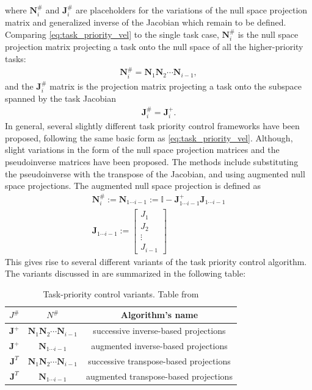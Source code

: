 where \(\bm{N}_i^{\#}\) and \(\bm{J}_i^{\#}\) are placeholders for the
variations of the null space projection matrix and generalized inverse of the Jacobian
which remain to be defined.
Comparing \autoref{eq:task_priority_vel} to the single task case, $\bm{N}_i^{\#}$ is the null space projection matrix
projecting a task onto the null space of all the higher-priority tasks:
\begin{align}
    \bm{N}_i^{\#} = \bm{N}_1 \bm{N}_2 \cdots \bm{N}_{i-1},
\end{align}
and the $\bm{J}_i^{\#}$ matrix is the projection matrix projecting a task onto the
subspace spanned by the task Jacobian
\begin{align}
    \bm{J}_i^{\#} = \bm{J}_i^+.
\end{align}
In general, several slightly different task priority control frameworks have
been proposed, following the same basic form as \autoref{eq:task_priority_vel}.
Although, slight variations in the form of the null space projection matrices
and the pseudoinverse matrices have been proposed. The methods include substituting
the pseudoinverse with the transpose of the Jacobian, and using augmented null space
projections.
The augmented null space projection is defined as
\begin{subequations}
    \label{eq:augmented_null_space}
\begin{align}
    \bm{N}_i^{\#} := \bm{N}_{1\cdots i-1} := \mathbb{I} - \bm{J}_{1\cdots i-1}^+ \bm{J}_{1\cdots i-1} \\
    \bm{J}_{1\cdots i-1} := \begin{bmatrix}
        J_1 \\
        J_2 \\
        \vdots \\
        J_{i-1}
    \end{bmatrix}
\end{align}
\end{subequations}
This gives rise to several different variants of the task priority control algorithm.
The variants discussed in \cite{antonelli2009} are summarized in the following table:
\begin{table}[h]
    \centering
    \begin{tabular}{|c|c|c|}
        \hline
        $J^{\#}$ & $N^{\#}$ & Algorithm's name \\
        \hline
        $\bm{J}^+$ & $\bm{N}_1 \bm{N}_2 \cdots \bm{N}_{i-1}$ & successive inverse-based projections \\
        $\bm{J}^+$ & $\bm{N}_{1\cdots i-1}$ & augmented inverse-based projections \\
        $\bm{J}^T$ & $\bm{N}_1 \bm{N}_2 \cdots \bm{N}_{i-1}$ & successive transpose-based projections \\
        $\bm{J}^T$ & $\bm{N}_{1\cdots i-1}$ & augmented transpose-based projections \\
        \hline
    \end{tabular}
    \label{tab:tpc_variants}
    \caption[Task-priority control variants]{Task-priority control variants. Table from \cite{antonelli2009}}
\end{table}

